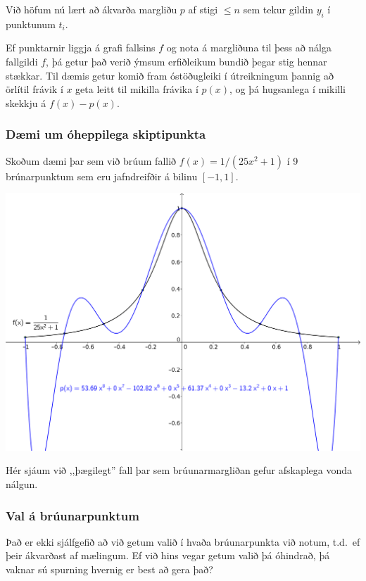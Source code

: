 \documentclass[a4paper,10pt,icelandic]{sphinxmanual}
\begin{document}
Við höfum nú lært að ákvarða margliðu \(p\) af stigi \(\leq n\)
sem tekur gildin \(y_i\) í punktunum \(t_i\).

Ef punktarnir liggja á grafi fallsins \(f\) og nota á margliðuna til
þess að nálga fallgildi \(f\), þá getur það verið ýmsum erfiðleikum
bundið þegar stig hennar stækkar. Til dæmis getur komið fram
óstöðugleiki í útreikningum þannig að örlítil frávik í \(x\) geta
leitt til mikilla frávika í \(p(x)\), og þá hugsanlega í mikilli
skekkju á \(f(x)-p(x)\).


\subsubsection{Dæmi um óheppilega skiptipunkta}
\label{kafli03:daemi-um-oheppilega-skiptipunkta}
Skoðum dæmi þar sem við brúum fallið \(f(x) = 1/(25x^2+1)\) í 9
brúnarpunktum sem eru jafndreifðir á bilinu \([-1,1]\).

\includegraphics{vond_bruun1.png}

Hér sjáum við ,,þægilegt'' fall þar sem brúunarmargliðan gefur afskaplega
vonda nálgun.


\subsubsection{Val á brúunarpunktum}
\label{kafli03:val-a-bruunarpunktum}
Það er ekki sjálfgefið að við getum valið í hvaða brúunarpunkta við
notum, t.d. ef þeir ákvarðast af mælingum. Ef við hins vegar getum valið
þá óhindrað, þá vaknar sú spurning hvernig er best að gera það?

\end{document}
